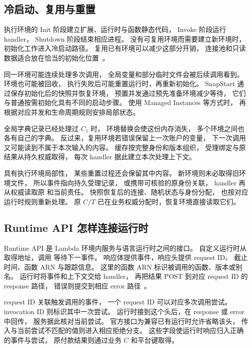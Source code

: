 \subsection{冷启动、复用与重置}

执行环境的 Init 阶段建立扩展、运行时与函数静态代码，
Invoke 阶段运行 handler，
Shutdown 阶段结束相应进程。
没有可复用环境而需要建立新环境时，
初始化工作进入冷启动路径。
复用已有环境可以减少这部分开销，
连接池和只读数据适合放在恰当的初始化位置~\cite{lambda-lifecycle}。

同一环境可能连续处理多次调用，
全局变量和部分临时文件会被后续调用看到。
环境也可能被回收，
执行失败后可能重置运行时，再重新初始化。
SnapStart 通过保存初始化后的快照并恢复环境，
预置并发通过预先准备环境减少等待，
它们与普通按需初始化具有不同的启动步骤。
使用 Managed Instances 等方式时，
再根据对应并发和生命周期规则安排局部状态。


全局字典记录已经处理过 $C_1$ 时，
环境替换会使这份内存消失，
多个环境之间也各有自己的字典。
反过来，复用环境若错误保留上一次账户的变量，
下一次调用又可能读到不属于本次输入的内容。
缓存按完整身份和版本组织，
受理绑定与原结果从持久权威取得，
每次 handler 据此建立本次处理上下文。

 具有执行环境局部性，
某些重置过程还会保留其中内容。
新环境则未必取得旧环境文件，
所以事件指向持久受理记录，
或携带可核验的原身份关联，
handler 再从权威读取原  和当前责任。
快照恢复后的连接、随机状态与身份分配，
也按对应运行时规则重新处理。
原 $C/T$ 已在业务权威分配时，恢复环境直接读取它们。

\subsection{Runtime API 怎样连接运行时}

Runtime API 是 Lambda 环境内服务与语言运行时之间的接口。
自定义运行时从 
取得地址，调用
等待下一事件。
响应体提供事件，响应头提供 request ID、
截止时间、函数 ARN 与跟踪信息。
这里的函数 ARN 标识被调用的函数、版本或别名。
运行时将事件和上下文交给 handler，
再把结果 POST 到对应 request ID 的 response 路径，
错误则提交到相应 error 路径~\cite{lambda-runtime-api}。

request ID 关联触发调用的事件，
一个 request ID 可以对应多次调用尝试。
invocation ID 则标识其中一次尝试。
运行时接到这个头后，在 response 或 error 中回传，
服务据此核对当前尝试。
官方接口为兼容已有运行时允许省略该头，
传入与当前尝试不匹配的值则进入相应拒绝分支。
这些字段使运行时响应归入正确的事件与尝试，
原付款结果则通过业务 $C$ 和平台键取得。

